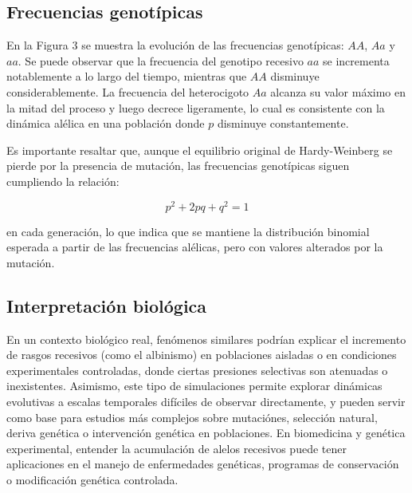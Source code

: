 \documentclass[12pt]{article}
\begin{document}
\subsection*{Frecuencias genotípicas}

En la Figura 3 se muestra la evolución de las frecuencias genotípicas: $AA$, $Aa$ y $aa$. Se puede observar que la frecuencia del genotipo recesivo $aa$ se incrementa notablemente a lo largo del tiempo, mientras que $AA$ disminuye considerablemente. La frecuencia del heterocigoto $Aa$ alcanza su valor máximo en la mitad del proceso y luego decrece ligeramente, lo cual es consistente con la dinámica alélica en una población donde $p$ disminuye constantemente.

Es importante resaltar que, aunque el equilibrio original de Hardy-Weinberg se pierde por la presencia de mutación, las frecuencias genotípicas siguen cumpliendo la relación:

\[
p^2 + 2pq + q^2 = 1
\]

en cada generación, lo que indica que se mantiene la distribución binomial esperada a partir de las frecuencias alélicas, pero con valores alterados por la mutación.

\subsection*{Interpretación biológica}
En un contexto biológico real, fenómenos similares podrían explicar el incremento de rasgos recesivos (como el albinismo) en poblaciones aisladas o en condiciones experimentales controladas, donde ciertas presiones selectivas son atenuadas o inexistentes.
Asimismo, este tipo de simulaciones permite explorar dinámicas evolutivas a escalas temporales difíciles de observar directamente, y pueden servir como base para estudios más complejos sobre mutaciónes, selección natural, deriva genética o intervención genética en poblaciones. En biomedicina y genética experimental, entender la acumulación de alelos recesivos puede tener aplicaciones en el manejo de enfermedades genéticas, programas de conservación o modificación genética controlada.\\
\end{document}
